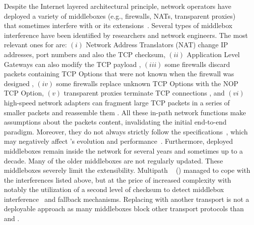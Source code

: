 Despite the Internet layered architectural principle, network operators have
deployed a variety of middleboxes (e.g., firewalls, NATs, transparent proxies)~\cite{mCloud} that sometimes interfere with \tcp or its extensions~\cite{medina2004measuring, honda2011still, edeline2019bottom}. Several types of middlebox interference have been identified by researchers and network engineers. The most relevant ones for \tcp are: $(i)$ Network Address Translators (NAT) change IP addresses, port numbers and also the TCP checksum, $(ii)$ Application Level Gateways can also modify the TCP payload \cite{rfc3207}, $(iii)$ some firewalls discard packets containing TCP Options that were not known when the firewall was designed \cite{edeline2020evaluating}, $(iv)$ some firewalls replace unknown TCP Options with the NOP TCP Option, $(v)$ transparent proxies terminate TCP connections \cite{zullo2019hic}, and $(vi)$ high-speed network adapters can fragment large TCP packets in a series of smaller packets and reassemble them \cite{honda2011still}. 
All these in-path network functions make assumptions about the \tcp packets content, invalidating the initial \tcp end-to-end paradigm. Moreover, they do not always strictly follow the \tcp specifications~\cite{honda2011still, hesmans2013tcp}, which may negatively affect \tcp's evolution and performance~\cite{edeline2020evaluating}. Furthermore, deployed middleboxes remain inside the network for several years and sometimes up to a decade. Many of the older middleboxes are not regularly updated. 
These middleboxes severely limit the \tcp extensibility. Multipath \tcp~\cite{rfc8684,raiciu2012hard} (\mptcp) managed to cope with the interferences listed above, but at the price of increased complexity with notably the utilization of a second level of checksum to detect middlebox interference~\cite{raiciu2012hard,hesmans2013tcp} and fallback mechanisms. Replacing with another transport is not a deployable approach as many middleboxes block other transport protocols than \tcp and \udp \cite{barik2020usability}.

